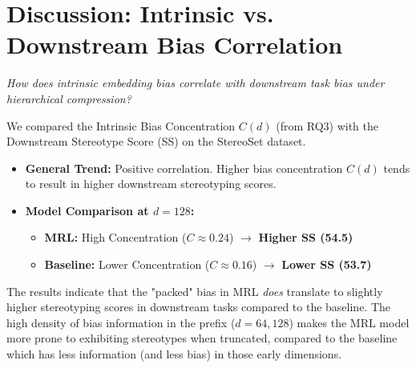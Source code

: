 \documentclass{article}
\begin{document}
\section{Discussion: Intrinsic vs. Downstream Bias Correlation}
\textit{How does intrinsic embedding bias correlate with downstream task bias under hierarchical compression?}

We compared the Intrinsic Bias Concentration $C(d)$ (from RQ3) with the Downstream Stereotype Score (SS) on the StereoSet dataset.

\begin{itemize}
    \item \textbf{General Trend:} Positive correlation. Higher bias concentration $C(d)$ tends to result in higher downstream stereotyping scores.
    \item \textbf{Model Comparison at $d=128$:}
    \begin{itemize}
        \item \textbf{MRL:} High Concentration ($C \approx 0.24$) $\rightarrow$ \textbf{Higher SS (54.5)}
        \item \textbf{Baseline:} Lower Concentration ($C \approx 0.16$) $\rightarrow$ \textbf{Lower SS (53.7)}
    \end{itemize}
\end{itemize}

The results indicate that the "packed" bias in MRL \textit{does} translate to slightly higher stereotyping scores in downstream tasks compared to the baseline. The high density of bias information in the prefix ($d=64, 128$) makes the MRL model more prone to exhibiting stereotypes when truncated, compared to the baseline which has less information (and less bias) in those early dimensions.
\end{document}

